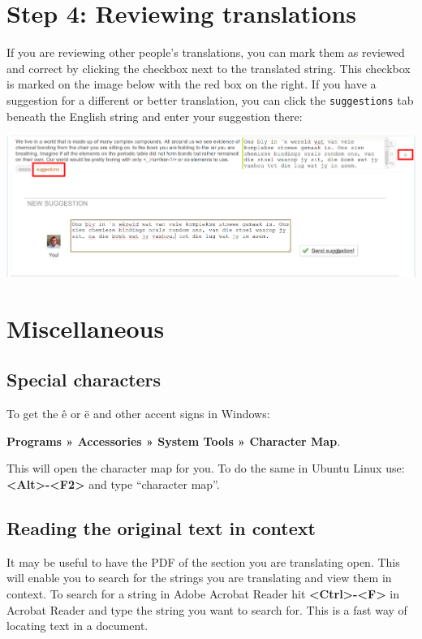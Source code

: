 \documentclass[10pt, a4paper]{article}
\begin{document}
\section*{Step 4: Reviewing translations}

If you are reviewing other people's translations, you can mark them as reviewed and correct by clicking the checkbox next to the translated string. This checkbox is marked on the image below with the red box on the right. If you have a suggestion for a different or better translation, you can click the \texttt{suggestions} tab beneath the English string and enter your suggestion there:
\begin{center}
    \centerline{\includegraphics[width=0.8\paperwidth]{images/suggestion.png}}
\end{center}




\section*{Miscellaneous}

\subsection*{Special characters}

To get the \^{e} or \"{e} and other accent signs in Windows: 
\begin{center}
\textbf{Programs » Accessories » System Tools » Character Map}. 
\end{center}
This will open the character map for you. To do the same in Ubuntu Linux use: \textbf{<Alt>-<F2>} and type ``character map''.

\subsection*{Reading the original text in context}

It may be useful to have the PDF of the section you are translating open. This will enable you to search for the strings you are translating and view them in context. To search for a string in Adobe Acrobat Reader hit \textbf{<Ctrl>-<F>} in Acrobat Reader and type the string you want to search for. This is a fast way of locating text in a document.
\end{document}
